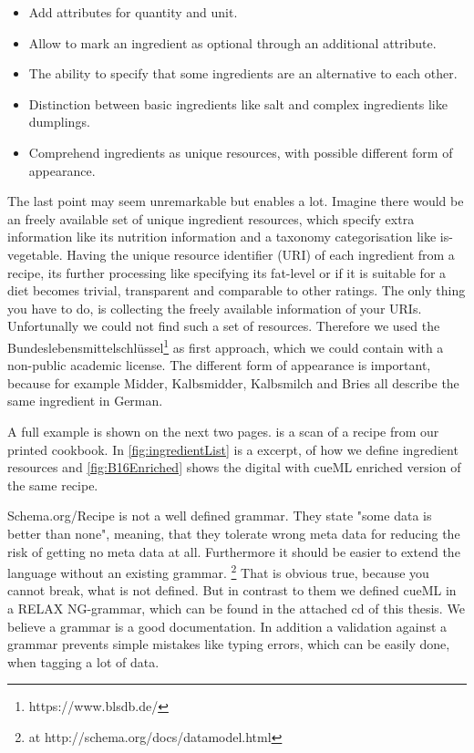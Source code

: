 \documentclass[12pt, twoside]{report}
\begin{document}
\begin{itemize}
	\item Add attributes for quantity and unit.
	\item Allow to mark an ingredient as optional through an additional attribute.
	\item The ability to specify that some ingredients are an alternative to each other.
	\item Distinction between basic ingredients like salt and complex ingredients like dumplings.
	\item Comprehend ingredients as unique resources, with possible different form of appearance.
\end{itemize}

The last point may seem unremarkable but enables a lot. Imagine there would be an freely available set of unique ingredient resources, which specify extra information like its nutrition information and a taxonomy categorisation like is-vegetable. Having the unique resource identifier (URI) of each ingredient from a recipe, its further processing like specifying its fat-level or if it is suitable for a diet becomes trivial, transparent and comparable to other ratings. The only thing you have to do, is collecting the freely available information of your URIs. Unfortunally we could not find such a set of resources. Therefore we used the Bundeslebensmittelschlüssel\footnote{https://www.blsdb.de/} as first approach, which we could contain with a non-public academic license. The different form of appearance is important, because for example Midder, Kalbsmidder, Kalbsmilch and Bries all describe the same ingredient in German.

A full example is shown on the next two pages.  is a scan of a recipe from our printed cookbook. In \cref{fig:ingredientList} is a excerpt, of how we define ingredient resources and \cref{fig:B16Enriched} shows the digital with cueML enriched version of the same recipe.

Schema.org/Recipe is not a well defined grammar. They state "some data is better than none", meaning, that they tolerate wrong meta data for reducing the risk of getting no meta data at all. Furthermore it should be easier to extend the language without an existing grammar. \parencite{schemaOrg}\footnote{at http://schema.org/docs/datamodel.html} That is obvious true, because you cannot break, what is not defined. But in contrast to them we defined cueML in a RELAX NG-grammar, which can be found in the attached cd of this thesis. We believe a grammar is a good documentation. In addition a validation against a grammar prevents simple mistakes like typing errors, which can be easily done, when tagging a lot of data.
\end{document}
